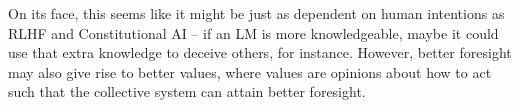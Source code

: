 \documentclass{article} %
\begin{document}
On its face, this seems like it might be just as dependent on human intentions as RLHF and Constitutional AI -- if an LM is more knowledgeable, maybe it could use that extra knowledge to deceive others, for instance. However, better foresight may also give rise to better values, where values are opinions about how to act such that the collective system can attain better foresight.
\end{document}
